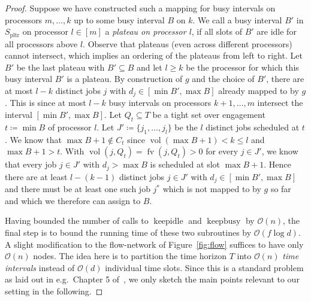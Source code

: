 \documentclass[a4paper]{article}
\DeclareMathOperator{\pltr}{pltr}
\DeclareMathOperator{\fv}{fv}
\DeclareMathOperator{\vol}{vol}
\DeclareMathOperator{\keepidle}{keepidle}
\DeclareMathOperator{\keepbusy}{keepbusy}
\begin{document}
\begin{proof}
  Suppose we have constructed such a mapping for busy intervals on processors $m, \ldots, k$ up to some busy interval $B$ on $k$.
  We call a busy interval $B'$ in $S_{\pltr}$ on processor $l \in [m]$ a \emph{plateau on processor $l$}, if all slots of $B'$ are idle for all processors above $l$.
  Observe that plateaus (even across different processors) cannot intersect, which implies an ordering of the plateaus from left to right.
  Let $B'$ be the last plateau with $B' \subseteq B$ and let $l \geq k$ be the processor for which this busy interval $B'$ is a plateau.
  By construction of $g$ and the choice of $B'$, there are at most $l - k$ distinct jobs $j$ with $d_j \in [\min B', \max B]$ already mapped to by $g$.
  This is since at most $l - k$ busy intervals on processors $k+1, \ldots, m$ intersect the interval $[\min B', \max B]$.
  Let $Q_t \subseteq T$ be a tight set over engagement $t \coloneqq \min B$ of processor $l$.
  Let $J' \coloneqq \{ j_1, \ldots, j_{l} \}$ be the $l$ distinct jobs scheduled at $t$.
  We know that $\max B + 1 \notin C_t$ since $\vol(\max B + 1) < k \leq l$ and $\max B + 1 > t$.
  With $\vol(j, Q_t) = \fv(j, Q_t) > 0$ for every $j \in J'$, we know that every job $j \in J'$ with $d_j > \max B$ is scheduled at slot $\max B + 1$.
  Hence there are at least $l - (k-1)$ distinct jobs $j \in J'$ with $d_j \in [\min B', \max B]$ and there must be at least one such job $j^*$ which is not mapped to by $g$ so far and which we therefore can assign to $B$.

  Having bounded the number of calls to $\keepidle$ and $\keepbusy$ by $\mathcal{O}(n)$, the final step is to bound the running time of these two subroutines by $\mathcal{O}(f \log d)$.
  A slight modification to the flow-network of Figure~\ref{fig:flow} suffices to have only $\mathcal{O}(n)$ nodes.
  The idea here is to partition the time horizon $T$ into $\mathcal{O}(n)$ \textit{time intervals} instead of $\mathcal{O}(d)$ individual time slots.
  Since this is a standard problem as laid out in e.g.\ Chapter 5 of~\cite{brucker_scheduling_algorithms}, we only sketch the main points relevant to our setting in the following.


\end{proof}
\end{document}
